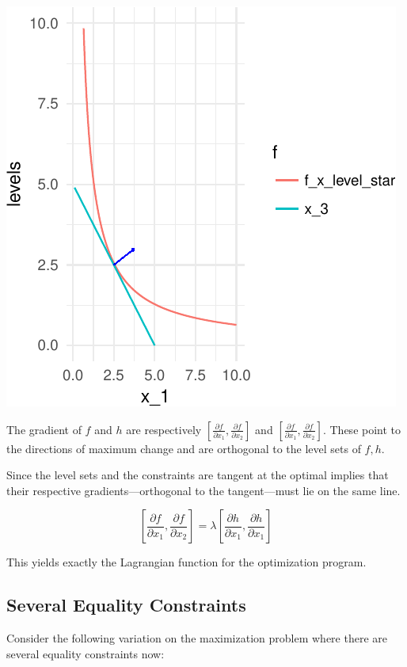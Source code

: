 \documentclass[11pt,]{article}
\begin{document}
\begin{center}\includegraphics{Optimization_2_files/figure-latex/opt_dim_2_eq_grad-1} \end{center}

The gradient of \(f\) and \(h\) are respectively
\([\frac{\partial f}{\partial x_1}, \frac{\partial f}{\partial x_2}]\)
and
\([\frac{\partial f}{\partial x_1}, \frac{\partial f}{\partial x_2}]\).
These point to the directions of maximum change and are orthogonal to
the level sets of \(f, h\).

Since the level sets and the constraints are tangent at the optimal
implies that their respective gradients---orthogonal to the
tangent---must lie on the same line.

\[
[\frac{\partial f}{\partial x_1}, \frac{\partial f}{\partial x_2}] = 
\lambda [\frac{\partial h}{\partial x_1}, \frac{\partial h}{\partial x_1}]
\]

This yields exactly the Lagrangian function for the optimization
program.

\subsection{Several Equality
Constraints}\label{several-equality-constraints}

Consider the following variation on the maximization problem where there
are several equality constraints now:
\end{document}
